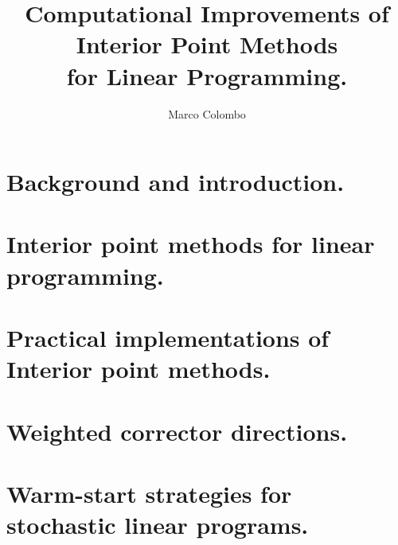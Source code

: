 \documentclass[phd,draft]{msthesis}
\title{Computational Improvements of \\
       Interior Point Methods \\
       for Linear Programming.}
\author{Marco Colombo}
\begin{document}
\maketitle

\dedication{For my family and my friends.\\
            Se'n foi me de chesta br\"ogna ch\'e?}
\standarddeclaration

%
%
\begin{abstract}
  
\end{abstract}

%
%
\begin{acknowledgements}
  
\end{acknowledgements}

%
%
\tableofcontents

%
%
\chapter{Background and introduction.}


\chapter{Interior point methods for linear programming.}


\chapter[Practical implementations of Interior point methods.]{Practical implementations of \\Interior point methods.}


\chapter{Weighted corrector directions.}


\chapter[Warm-start strategies for stochastic linear programs.]{Warm-start strategies for \\stochastic linear programs.}


%
%
%

%
%
%



%
%
\end{document}
